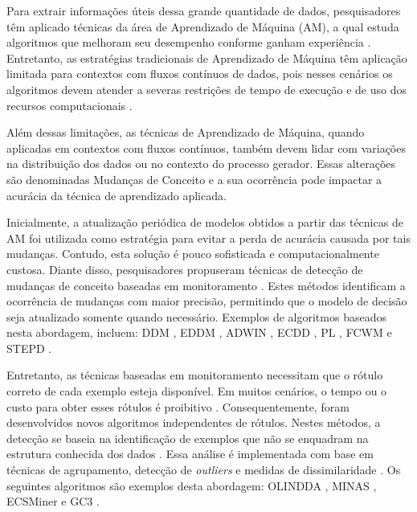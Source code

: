 \documentclass[msc, classic, a4paper]{ufbathesis}
\begin{document}
Para extrair informações úteis dessa grande quantidade de dados,
pesquisadores têm aplicado técnicas da área de Aprendizado de Máquina (AM),
a qual estuda algoritmos que melhoram seu desempenho conforme ganham experiência \cite{Mitchell:1997:ML:541177}.
%
Entretanto, as estratégias tradicionais de Aprendizado de Máquina têm aplicação limitada para contextos com fluxos contínuos de dados,
pois nesses cenários os algoritmos devem atender a severas restrições de tempo de execução e de uso dos recursos computacionais \cite{bifet2009data}.

Além dessas limitações,
as técnicas de Aprendizado de Máquina,
quando aplicadas em contextos com fluxos contínuos,
também devem lidar com variações na distribuição dos dados ou no contexto do processo gerador.
%
Essas alterações são denominadas Mudanças de Conceito \cite{Gama:2010:KDD:1855075} e
a sua ocorrência pode impactar a acurácia da técnica de aprendizado aplicada.

Inicialmente, a atualização periódica de modelos obtidos a partir das técnicas de AM foi utilizada como estratégia para evitar a perda de acurácia causada por tais mudanças.
%
Contudo, esta solução é pouco sofisticada e computacionalmente custosa.
%
Diante disso, pesquisadores propuseram técnicas de detecção de mudanças de conceito baseadas em monitoramento \cite{Gama:2014:SCD:2597757.2523813}.
%
Estes métodos identificam a ocorrência de mudanças com maior precisão, permitindo que o modelo de decisão seja atualizado somente quando necessário.
%
Exemplos de algoritmos baseados nesta abordagem, incluem:
DDM \cite{GamaMCR04}, EDDM \cite{EDDM},
ADWIN \cite{BifetG07}, ECDD \cite{Ross:2012:EWM:2076039.2076307},
PL \cite{Bach:PL:2008}, FCWM \cite{FCWM} e STEPD \cite{STEPD}.

Entretanto, as técnicas baseadas em monitoramento necessitam que o rótulo correto de cada exemplo esteja disponível.
%
Em muitos cenários, o tempo ou o custo para obter esses rótulos é proibitivo \cite{Aggarwal:2006:DSM:1196418}.
%
Consequentemente, foram desenvolvidos novos algoritmos independentes de rótulos.
Nestes métodos, a detecção se baseia na identificação de exemplos que não se enquadram na estrutura conhecida dos dados \cite{Spinosa:2007:OCA:1244002.1244107}.
%
Essa análise é implementada com base em técnicas de agrupamento, detecção de \textit{outliers} e medidas de dissimilaridade \cite{Ryu:Kantardzic:2012}.
%
Os seguintes algoritmos são exemplos desta abordagem:
OLINDDA \cite{Spinosa:2007:OCA:1244002.1244107},
MINAS \cite{Faria:2013:NDA:2480362.2480515},
ECSMiner \cite{Masud:2011:CNC:1978259.1978529} e
GC3 \cite{Sethi2016b:GC3}.
\end{document}
